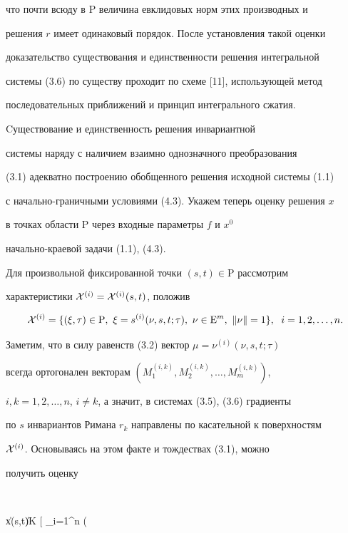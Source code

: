 что почти всюду в $\mathrm P$ величина евклидовых норм этих производных и 


решения $r$ имеет одинаковый порядок. После установления такой оценки 


доказательство существования и единственности решения интегральной 


системы (3.6) по существу проходит по схеме [11], использующей метод 


последовательных приближений и принцип интегрального сжатия.





Cуществование и единственность решения инвариантной 


системы наряду с наличием взаимно однозначного преобразования


(3.1) адекватно построению обобщенного решения исходной системы (1.1)


с начально-граничными условиями (4.3). Укажем теперь оценку решения $x$ 


в точках области $\mathrm P$ через входные параметры $f$ и $x^0$


начально-краевой задачи (1.1), (4.3).





Для произвольной фиксированной точки $(s,t) \in {\mathrm P}$ рассмотрим 


характеристики ${\cal X}^{(i)}={\cal X}^{(i)}(s,t)$, положив


$$


{\cal X}^{(i)}=\{ (\xi,\tau) \in {\mathrm P},\ \xi=s^{(i)}(\nu,s,t; \tau), 


\ \nu \in {\mathrm E}^m,\ \| \nu \|=1\},\ \; i=1,2,\dotsc,n.


$$


Заметим, что в силу равенств (3.2) вектор $\mu=\nu^{(i)}(\nu,s,t; \tau)$


всегда ортогонален векторам $(M^{(i,k)}_1, M^{(i,k)}_2,\dotsc, M^{(i,k)}_m)$,


$i,k=1,2,\dotsc,n$, $i \neq k$, а значит, в системах (3.5), (3.6) градиенты


по $s$ инвариантов Римана $r_k$ направлены по касательной к поверхностям 


${\cal X}^{(i)}$. Основываясь на этом факте и тождествах (3.1), можно 


получить оценку


$$


\|x(s,t)\| \leq K \bigg[ \sum_{i=1}^n \bigg(\;


